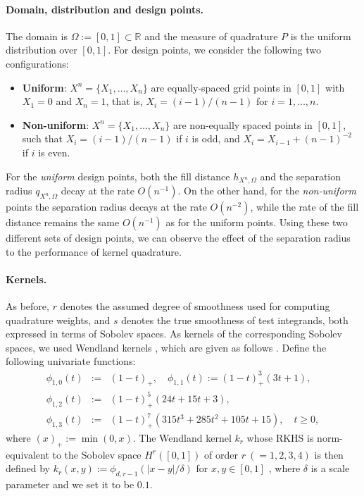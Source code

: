 \documentclass[11pt]{article}
\theoremstyle{remark}
\theoremstyle{example}
\theoremstyle{remark}
\newcommand{\R}{\mathbb{R}}
\newcommand{\citep}{\cite}
\begin{document}
\paragraph{Domain, distribution and design points.}
The domain is $\Omega := [0,1] \subset \R$ and the measure of quadrature $P$ is the uniform distribution over $[0,1]$.
For design points, we consider the following two configurations:
\begin{itemize}
\item \textbf{Uniform}: $X^n = \{X_1,\dots,X_n\}$ are equally-spaced grid points in $[0,1]$ with $X_1 = 0$ and $X_n = 1$, that is, $X_i = (i-1) / (n-1)$ for $i = 1,\dots,n$. \vspace{-1mm}
\item \textbf{Non-uniform}: $X^n = \{X_1,\dots,X_n \}$ are non-equally spaced points in $[0,1]$, such that $X_i = (i-1)/(n-1)$ if $i$ is odd, and $X_i = X_{i-1} + (n-1)^{-2}$ if $i$ is even.
\end{itemize}
For the {\em uniform} design points, both the fill distance $h_{X^n,\Omega}$ and the separation radius $q_{X^n, \Omega}$ decay at the rate $O(n^{-1})$.
On the other hand, for the {\em non-uniform} points the separation radius decays at the rate $O(n^{-2})$, while the rate of the fill distance remains the same $O(n^{-1})$ as for the uniform points.
Using these two different sets of design points, we can observe the effect of the separation radius to the performance of kernel quadrature.\vspace{-3mm}

\paragraph{Kernels.}
As before, $r$ denotes the assumed degree of smoothness used for computing quadrature weights, and $s$ denotes the true smoothness of test integrands, both expressed in terms of Sobolev spaces.
As kernels of the corresponding Sobolev spaces, we used Wendland kernels \cite[Definition 9.11]{Wen05}, which are given as follows \cite[Corollary 9.14]{Wen05}. Define the following univariate functions:
\begin{eqnarray*}
\phi_{1,0}(t) &:=& (1-t)_+, \quad \phi_{1,1}(t) := (1-t)_+^3 ( 3 t + 1 ), \\
\phi_{1,2}(t) &:=& (1-t)_+^5 ( 24 t + 15 t + 3), \\
\phi_{1,3}(t) &:=& (1-t)_+^7 ( 315 t^3 + 285 t^2 + 105 t + 15), \quad t \geq 0,
\end{eqnarray*}
where $(x)_+ := \min(0,x)$.
The Wendland kernel $k_r$ whose RKHS is norm-equivalent to the Sobolev space $H^r ([0,1])$ of order $r\ (= 1,2,3,4)$ is then defined by
$k_r(x,y) := \phi_{d,r-1}( | x - y | / \delta )$ for $x, y \in [0,1]$ \citep[Theorem 10.35]{Wen05},
where $\delta$ is a scale parameter and we set it to be $0.1$.\vspace{-3mm}
\end{document}
